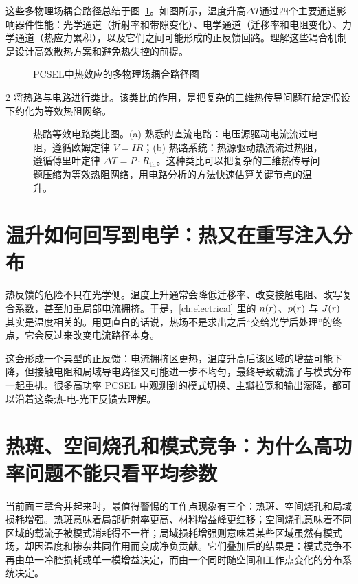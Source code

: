 这些多物理场耦合路径总结于图~\ref{fig:ch19_thermal_coupling}。如图所示，温度升高$\Delta T$通过四个主要通道影响器件性能：光学通道（折射率和带隙变化）、电学通道（迁移率和电阻变化）、力学通道（热应力累积），以及它们之间可能形成的正反馈回路。理解这些耦合机制是设计高效散热方案和避免热失控的前提。

\begin{figure}[htbp]
  \centering
  
  \caption{PCSEL中热效应的多物理场耦合路径图}
  \label{fig:ch19_thermal_coupling}
\end{figure}

\cref{fig:ch19_thermal_circuit_analogy} 将热路与电路进行类比。该类比的作用，是把复杂的三维热传导问题在给定假设下约化为等效热阻网络。

\begin{figure}[htbp]
  \centering
  
  \caption{热路等效电路类比图。(a) 熟悉的直流电路：电压源驱动电流流过电阻，遵循欧姆定律 $V=IR$；(b) 热路系统：热源驱动热流流过热阻，遵循傅里叶定律 $\Delta T = P \cdot R_{\mathrm{th}}$。这种类比可以把复杂的三维热传导问题压缩为等效热阻网络，用电路分析的方法快速估算关键节点的温升。}
  \label{fig:ch19_thermal_circuit_analogy}
\end{figure}

\section[温升如何回写到电学]{温升如何回写到电学：热又在重写注入分布}
热反馈的危险不只在光学侧。温度上升通常会降低迁移率、改变接触电阻、改写复合系数，甚至加重局部电流拥挤。于是，\cref{ch:electrical} 里的 $n(r)$、$p(r)$ 与 $J(r)$ 其实是温度相关的。用更直白的话说，热场不是求出之后“交给光学后处理”的终点，它会反过来改变电流路径本身。

这会形成一个典型的正反馈：电流拥挤区更热，温度升高后该区域的增益可能下降，但接触电阻和局域导电路径又可能进一步不均匀，最终导致载流子与模式分布一起重排。很多高功率 PCSEL 中观测到的模式切换、主瓣拉宽和输出滚降，都可以沿着这条热-电-光正反馈去理解。

\section{热斑、空间烧孔和模式竞争：为什么高功率问题不能只看平均参数}
当前面三章合并起来时，最值得警惕的工作点现象有三个：热斑、空间烧孔和局域损耗增强。热斑意味着局部折射率更高、材料增益峰更红移；空间烧孔意味着不同区域的载流子被模式消耗得不一样；局域损耗增强则意味着某些区域虽然有模式场，却因温度和掺杂共同作用而变成净负贡献。它们叠加后的结果是：模式竞争不再由单一冷腔损耗或单一模增益决定，而由一个同时随空间和工作点变化的分布系统决定。

